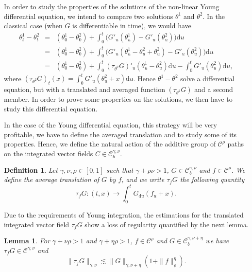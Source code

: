 \documentclass[a4paper,11pt]{article}
\newcommand{\mathd}{\mathrm{d}}
\newtheorem{definition}[theorem]{Definition}
\newtheorem{lemma}[theorem]{Lemma}
\newcommand{\CC}{\mathscr C}
\begin{document}
In order to study the properties of the solutions of the non-linear Young
differential equation, we intend to compare two solutions $\theta^{1}$ and
$\theta^{2}$. In the classical case (when $G$ is differentiable in time), we
would have
\begin{eqnarray*}
  \theta^{1}_{t} - \theta^{2}_{t} & = & ( \theta^{1}_{0} - \theta^{2}_{0} ) +
  \int_{0}^{t}\big( G'_{u} ( \theta^{1}_{u} ) -G'_{u} ( \theta^{2}_{u} )\big) \mathd u\\
  & = & ( \theta^{1}_{0} - \theta^{2}_{0} ) + \int_{0}^{t} \big( G'_{u} (
  \theta^{1}_{u} - \theta^{2}_{u} + \theta^{2}_{u} ) -G'_{u} ( \theta^{2}_{u}
  )\big) \mathd u\\
  & = & ( \theta^{1}_{0} - \theta^{2}_{0} ) + \int_{0}^{t} (
  \tau_{\theta^{2}} G )'_{u} ( \theta^{1}_{u} - \theta^{2}_{u} ) \mathd u-
  \int_{0}^{t} G'_{u} ( \theta^{2}_{u} ) \mathd u,
\end{eqnarray*}
where $( \tau_{\theta^{2}} G )_{t} ( x ) = \int_{0}^{t} G'_{u} (
\theta^{2}_{u} +x ) \mathd u$. Hence $\theta^{1} - \theta^{2}$ solve a
differential equation, but with a translated and averaged function $(
\tau_{\theta^{2}} G )$ and a second member. In order to prove some properties
on the solutions, we then have to study this differential equation.

In the case of the Young differential equation, this strategy will be very
profitable, we have to define the averaged translation and to study some
of its properties. Hence, we define the natural action of the additive group
of $\CC^{\rho}$ paths on the integrated vector fields $C \in \CC^{\gamma ,
\nu}_{b}$.

\begin{definition}
  Let $\gamma , \nu , \rho \in [ 0,1 ]$ such that $\gamma + \rho \nu >1$, $G
  \in \CC_{b}^{\gamma , \nu}$ and $f \in \CC^{\rho}$. We define the average
  translation of $G$ by $f$, and we write $\tau_{f} G$ the following quantity
  \[ \tau_{f} G: ( t,x ) \rightarrow \int_{0}^{t} G_{\mathd u} ( f_{u} +x ) .
  \]
\end{definition}

Due to the requirements of Young integration, the estimations for the
translated integrated vector field $\tau_{f} G$ show a loss of regularity
quantified by the next lemma.

\begin{lemma}
  \label{lemma:translation}For $\gamma + \nu \rho >1$ and $\gamma + \eta \rho
  >1$, $f \in \CC^{\rho}$ and $G \in \CC_{b}^{\gamma , \nu + \eta}$ we have
  $\tau_{f} G \in \CC^{\gamma , \nu}$ and
  \[ \| \tau_{f} G \|_{\gamma , \nu} \lesssim \| G \|_{\gamma , \nu + \eta} (
     1+ \| f \|^{\eta}_{\rho} ) .\]
\end{lemma}
\end{document}
